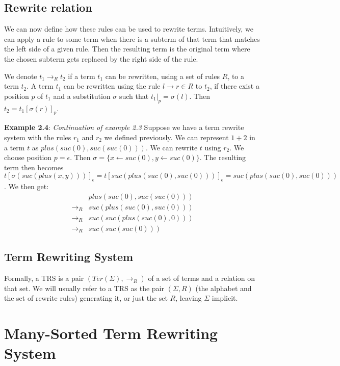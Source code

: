 \subsection{Rewrite relation}
We can now define how these rules can be used to rewrite terms. Intuitively, we can apply a rule to some term when there is a subterm of that term that matches the left side of a given rule. Then the resulting term is the original term where the chosen subterm gets replaced by the right side of the rule.
\begin{definition}
We denote $t_1 \rightarrow_R t_2$ if a term $t_1$ can be rewritten, using a set of rules $R$, to a term $t_2$. A term $t_1$ can be rewritten using the rule $l \rightarrow r \in R$ to $t_2$, if there exist a position $p$ of $t_1$ and a substitution $\sigma$ such that $\left.t_1\right|_p = \sigma(l)$. Then $t_2 = t_1\left[ \sigma(r) \right]_p$. 
\end{definition}

\textbf{Example 2.4}: \textit{Continuation of example 2.3} Suppose we have a term rewrite system with the rules $r_1$ and $r_2$ we defined previously. We can represent $1 + 2$ in a term $t$ as $plus(suc(0), suc(suc(0)))$. We can rewrite $t$ using $r_2$. We choose position $p = \epsilon$. Then $\sigma = \{ x \leftarrow suc(0), y \leftarrow suc(0) \}$. The resulting term then becomes $t\left[ \sigma(suc(plus(x, y))) \right]_\epsilon = t\left[ suc(plus(suc(0), suc(0))) \right]_\epsilon = suc(plus(suc(0), suc(0)))$. We then get:
$$
\begin{array}{rl}
                  & plus(suc(0), suc(suc(0))) \\
    \rightarrow_R & suc(plus(suc(0), suc(0))) \\
    \rightarrow_R & suc(suc(plus(suc(0), 0))) \\
    \rightarrow_R & suc(suc(suc(0)))
\end{array}
$$

\subsection{Term Rewriting System}
Formally, a TRS is a pair $(\textit{Ter}(\Sigma), \rightarrow_R)$ of a set of terms and a relation on that set. We will usually refer to a TRS as the pair $(\Sigma, R)$ (the alphabet and the set of rewrite rules) generating it, or just the set $R$, leaving $\Sigma$ implicit.

\section{Many-Sorted Term Rewriting System}
